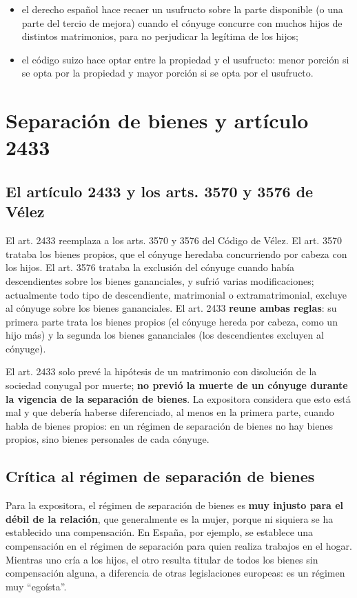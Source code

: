 \documentclass[12pt,oneside]{book}
\begin{document}
\begin{itemize}
    \item el derecho español hace recaer un usufructo sobre la parte disponible (o una parte del tercio de mejora) cuando el cónyuge concurre con muchos hijos de distintos matrimonios, para no perjudicar la legítima de los hijos;
    \item el código suizo hace optar entre la propiedad y el usufructo: menor porción si se opta por la propiedad y mayor porción si se opta por el usufructo.
\end{itemize}

\section{Separación de bienes y artículo 2433}

\subsection{El artículo 2433 y los arts. 3570 y 3576 de Vélez}

El art. 2433 reemplaza a los arts. 3570 y 3576 del Código de Vélez. El art. 3570 trataba los bienes propios, que el cónyuge heredaba concurriendo por cabeza con los hijos. El art. 3576 trataba la exclusión del cónyuge cuando había descendientes sobre los bienes gananciales, y sufrió varias modificaciones; actualmente todo tipo de descendiente, matrimonial o extramatrimonial, excluye al cónyuge sobre los bienes gananciales. El art. 2433 \textbf{reune ambas reglas}: su primera parte trata los bienes propios (el cónyuge hereda por cabeza, como un hijo más) y la segunda los bienes gananciales (los descendientes excluyen al cónyuge).

El art. 2433 solo prevé la hipótesis de un matrimonio con disolución de la sociedad conyugal por muerte; \textbf{no previó la muerte de un cónyuge durante la vigencia de la separación de bienes}. La expositora considera que esto está mal y que debería haberse diferenciado, al menos en la primera parte, cuando habla de bienes propios: en un régimen de separación de bienes no hay bienes propios, sino bienes personales de cada cónyuge.

\subsection{Crítica al régimen de separación de bienes}

Para la expositora, el régimen de separación de bienes es \textbf{muy injusto para el débil de la relación}, que generalmente es la mujer, porque ni siquiera se ha establecido una compensación. En España, por ejemplo, se establece una compensación en el régimen de separación para quien realiza trabajos en el hogar. Mientras uno cría a los hijos, el otro resulta titular de todos los bienes sin compensación alguna, a diferencia de otras legislaciones europeas: es un régimen muy ``egoísta''.
\end{document}
